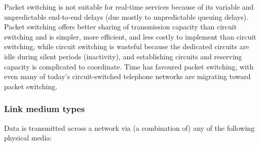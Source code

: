 \documentclass[table, xcdraw]{article}%
\begin{document}
Packet switching is not suitable for real-time services because of its variable and unpredictable end-to-end delays (due mostly to unpredictable queuing delays). Packet switching offers better sharing of transmission capacity than circuit switching and is simpler, more efficient, and less costly to implement than circuit switching, while circuit switching is wasteful because the dedicated circuits are idle during silent periods (inactivity), and establishing circuits and reserving capacity is complicated to coordinate. Time has favoured packet switching, with even many of today’s circuit-switched telephone networks are migrating toward packet switching.

\subsubsection{Link medium types}

Data is transmitted across a network via (a combination of) any of the following physical media:
\end{document}
